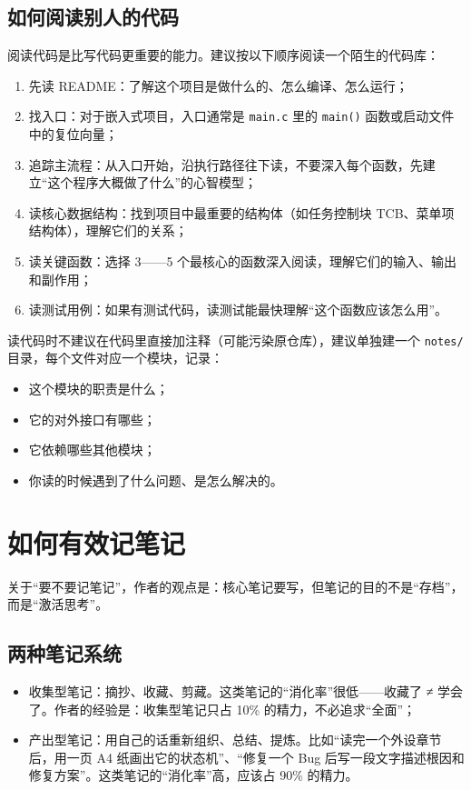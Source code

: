 \subsection{如何阅读别人的代码}

阅读代码是比写代码更重要的能力。建议按以下顺序阅读一个陌生的代码库：

\begin{enumerate}
	\item 先读 README：了解这个项目是做什么的、怎么编译、怎么运行；
	\item 找入口：对于嵌入式项目，入口通常是 \texttt{main.c} 里的 \texttt{main()} 函数或启动文件中的复位向量；
	\item 追踪主流程：从入口开始，沿执行路径往下读，不要深入每个函数，先建立“这个程序大概做了什么”的心智模型；
	\item 读核心数据结构：找到项目中最重要的结构体（如任务控制块 TCB、菜单项结构体），理解它们的关系；
	\item 读关键函数：选择 3——5 个最核心的函数深入阅读，理解它们的输入、输出和副作用；
	\item 读测试用例：如果有测试代码，读测试能最快理解“这个函数应该怎么用”。
\end{enumerate}

读代码时不建议在代码里直接加注释（可能污染原仓库），建议单独建一个 \texttt{notes/} 目录，每个文件对应一个模块，记录：
\begin{itemize}
	\item 这个模块的职责是什么；
	\item 它的对外接口有哪些；
	\item 它依赖哪些其他模块；
	\item 你读的时候遇到了什么问题、是怎么解决的。
\end{itemize}

\section{如何有效记笔记}

关于“要不要记笔记”，作者的观点是：核心笔记要写，但笔记的目的不是“存档”，而是“激活思考”。

\subsection{两种笔记系统}

\begin{itemize}
	\item 收集型笔记：摘抄、收藏、剪藏。这类笔记的“消化率”很低——收藏了 ≠ 学会了。作者的经验是：收集型笔记只占 10\% 的精力，不必追求“全面”；
	\item 产出型笔记：用自己的话重新组织、总结、提炼。比如“读完一个外设章节后，用一页 A4 纸画出它的状态机”、“修复一个 Bug 后写一段文字描述根因和修复方案”。这类笔记的“消化率”高，应该占 90\% 的精力。
\end{itemize}

